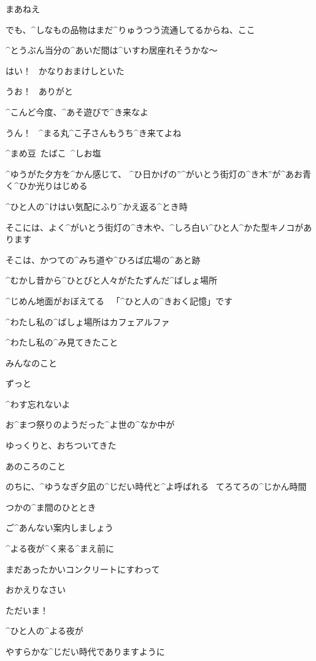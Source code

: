 \R まあねえ

\R でも、^{しなもの}{品物}はまだ^{りゅうつう}{流通}してるからね、ここ

\R ^{とうぶん}{当分}の^{あいだ}{間}は^{いすわ}{居座}れそうかな〜

\R はい！
\ かなりおまけしといた

\A うお！
\ ありがと

\page
\R ^{こんど}{今度}、^{あそ}{遊}びで^{き}{来}なよ

\A うん！
\ ^{まる}{丸}^{こ}{子}さんもうち^{き}{来}てよね

\Sign ^{まめ}{豆}\ たばこ\ ^{しお}{塩}

\page
\A ^{ゆうがた}{夕方}を^{かん}{感}じて、
^{ひ}{日}かげの”^{がいとう}{街灯}の^{き}{木}”が^{あお}{青}く^{ひか}{光}りはじめる

\A ^{ひと}{人}の^{けはい}{気配}にふり^{かえ}{返}る^{とき}{時}

\A そこには、よく^{がいとう}{街灯}の^{き}{木}や、^{しろ}{白}い^{ひと}{人}^{かた}{型}キノコがあります

\A そこは、かつての^{みち}{道}や^{ひろば}{広場}の^{あと}{跡}

\A ^{むかし}{昔}から^{ひとびと}{人々}がたたずんだ^{ばしょ}{場所}

\A ^{じめん}{地面}がおぼえてる
\ 「^{ひと}{人}の^{きおく}{記憶}」です

\page
\A ^{わたし}{私}の^{ばしょ}{場所}はカフェアルファ

\A ^{わたし}{私}の^{み}{見}てきたこと

\A みんなのこと

\page
\A ずっと

\A ^{わす}{忘}れないよ

\A お^{まつ}{祭}りのようだった^{よ}{世}の^{なか}{中}が

\A ゆっくりと、おちついてきた

\A あのころのこと

\page
\A のちに、^{ゆうなぎ}{夕凪}の^{じだい}{時代}と^{よ}{呼}ばれる
\ てろてろの^{じかん}{時間}

\A つかの^{ま}{間}のひととき

\A ご^{あんない}{案内}しましょう

\A ^{よる}{夜}が^{く}{来}る^{まえ}{前}に

\A まだあったかいコンクリートにすわって

\K おかえりなさい

\page
\A ただいま！

\A ^{ひと}{人}の^{よる}{夜}が

\A やすらかな^{じだい}{時代}でありますように
